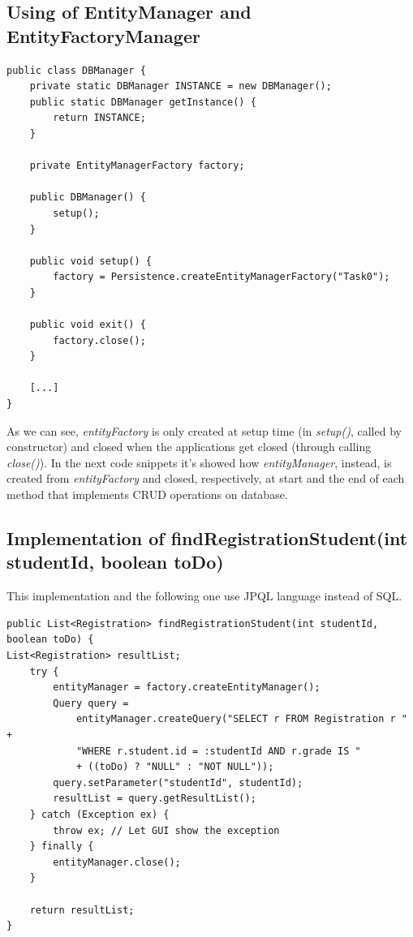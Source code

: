 \documentclass{report}
\begin{document}
\subsection*{Using of EntityManager and EntityFactoryManager}
\begin{lstlisting}
public class DBManager {
	private static DBManager INSTANCE = new DBManager();
	public static DBManager getInstance() {
		return INSTANCE;
	}

	private EntityManagerFactory factory;

	public DBManager() {
		setup();
	}

	public void setup() {
		factory = Persistence.createEntityManagerFactory("Task0");
	}

	public void exit() {
		factory.close();
	}

	[...]
}
\end{lstlisting}
As we can see, \textit{entityFactory} is only created at setup time (in \textit{setup()}, called by constructor) and closed when the applications get closed (through calling \textit{close()}). In the next code snippets it's showed how \textit{entityManager}, instead, is created from \textit{entityFactory} and closed, respectively, at start and the end of each method that implements CRUD operations on database.
\\

\subsection*{Implementation of findRegistrationStudent(int studentId, boolean toDo)}
This implementation and the following one use JPQL language instead of SQL.
\begin{lstlisting}
public List<Registration> findRegistrationStudent(int studentId, boolean toDo) {
List<Registration> resultList;
	try {
		entityManager = factory.createEntityManager();
		Query query =
			entityManager.createQuery("SELECT r FROM Registration r " +
			"WHERE r.student.id = :studentId AND r.grade IS "
			+ ((toDo) ? "NULL" : "NOT NULL"));
		query.setParameter("studentId", studentId);
		resultList = query.getResultList();
	} catch (Exception ex) {
		throw ex; // Let GUI show the exception
	} finally {
		entityManager.close();
	}

	return resultList;
}
\end{lstlisting}
\end{document}
